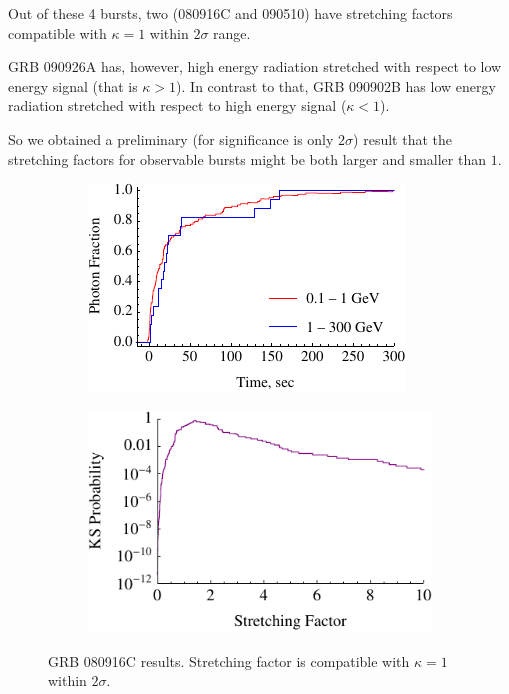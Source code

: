 \documentclass{article}
\begin{document}
Out of these 4 bursts, two (080916C and 090510) have stretching factors compatible with $\kappa = 1$ within $2\sigma$ range.

GRB 090926A has, however, high energy radiation stretched with respect to low energy signal (that is $\kappa > 1$). In contrast to that, GRB 090902B has low energy radiation stretched with respect to high energy signal ($\kappa < 1$).

So we obtained a preliminary (for significance is only $2\sigma$) result that the stretching factors for observable bursts might be both larger and smaller than $1$.

\begin{figure}
        \centering
        \begin{subfigure}{0.49\textwidth}
                \includegraphics[width=\textwidth]{lightCurve080916C}
                \label{fig:lightCurve080916C}
        \end{subfigure}
        \begin{subfigure}{0.49\textwidth}
                \includegraphics[width=\textwidth]{probabilities080916C}
                \label{fig:probabilities080916C}
        \end{subfigure}
        \caption{GRB 080916C results. Stretching factor is compatible with $\kappa = 1$ within $2\sigma$.}
        \label{fig:grb080916C}
\end{figure}
\end{document}
